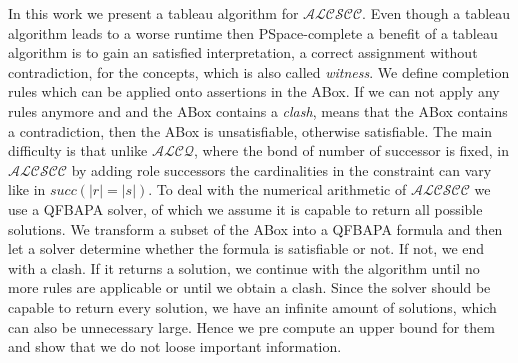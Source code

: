 \documentclass{book}
\theoremstyle{break}
\theoremstyle{definition}
\begin{document}
In this work we present a tableau algorithm for $\mathcal{ALCSCC}$. Even though a tableau algorithm leads to a worse runtime then PSpace-complete a benefit of a tableau algorithm is to gain an satisfied interpretation, a correct assignment without contradiction, for the concepts, which is also called \textit{witness}. We define completion rules which can be applied onto assertions in the ABox. If we can not apply any rules anymore and and the ABox contains a \textit{clash}, means that the ABox contains a contradiction, then the ABox is unsatisfiable, otherwise satisfiable. The main difficulty is that unlike $\mathcal{ALCQ}$, where the bond of number of successor is fixed, in $\mathcal{ALCSCC}$ by adding role successors the cardinalities in the constraint can vary like in $succ(|r|=|s|)$. To deal with the numerical arithmetic of $\mathcal{ALCSCC}$ we use a QFBAPA solver, of which we assume it is capable to return all possible solutions. We transform a subset of the ABox into a QFBAPA formula and then let a solver determine whether the formula is satisfiable or not. If not, we end with a clash. If it returns a solution, we continue with the algorithm until no more rules are applicable or until we obtain a clash. Since the solver should be capable to return every solution, we have an infinite amount of solutions, which can also be unnecessary large. Hence we pre compute an upper bound for them and show that we do not loose important information.
\end{document}
